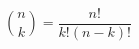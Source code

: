 \documentclass{article}
\begin{document}
\thispagestyle{empty}
\[
  \binom{n}{k} = \frac{n!}{k!(n-k)!}
\]
\end{document}
